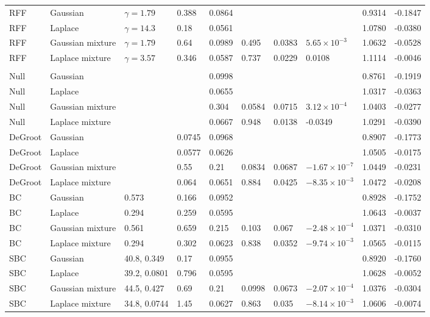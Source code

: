 \begin{longtable}{llllllllrr}
RFF & Gaussian & $\gamma=1.79$ & 0.388 & 0.0864 &  &  &  & 0.9314 & -0.1847 \\
RFF & Laplace & $\gamma=14.3$ & 0.18 & 0.0561 &  &  &  & 1.0780 & -0.0380 \\
RFF & Gaussian mixture & $\gamma=1.79$ & 0.64 & 0.0989 & 0.495 & 0.0383 & $5.65\times10^{-3}$ & 1.0632 & -0.0528 \\
RFF & Laplace mixture & $\gamma=3.57$ & 0.346 & 0.0587 & 0.737 & 0.0229 & 0.0108 & 1.1114 & -0.0046 \\
\midrule
\multicolumn{10}{l}{\senate{}} \\
Null & Gaussian &  &  & 0.0998 &  &  &  & 0.8761 & -0.1919 \\
Null & Laplace &  &  & 0.0655 &  &  &  & 1.0317 & -0.0363 \\
Null & Gaussian mixture &  &  & 0.304 & 0.0584 & 0.0715 & $3.12\times10^{-4}$ & 1.0403 & -0.0277 \\
Null & Laplace mixture &  &  & 0.0667 & 0.948 & 0.0138 & -0.0349 & 1.0291 & -0.0390 \\
DeGroot & Gaussian &  & 0.0745 & 0.0968 &  &  &  & 0.8907 & -0.1773 \\
DeGroot & Laplace &  & 0.0577 & 0.0626 &  &  &  & 1.0505 & -0.0175 \\
DeGroot & Gaussian mixture &  & 0.55 & 0.21 & 0.0834 & 0.0687 & $-1.67\times10^{-7}$ & 1.0449 & -0.0231 \\
DeGroot & Laplace mixture &  & 0.064 & 0.0651 & 0.884 & 0.0425 & $-8.35\times10^{-3}$ & 1.0472 & -0.0208 \\
BC & Gaussian & 0.573 & 0.166 & 0.0952 &  &  &  & 0.8928 & -0.1752 \\
BC & Laplace & 0.294 & 0.259 & 0.0595 &  &  &  & 1.0643 & -0.0037 \\
BC & Gaussian mixture & 0.561 & 0.659 & 0.215 & 0.103 & 0.067 & $-2.48\times10^{-4}$ & 1.0371 & -0.0310 \\
BC & Laplace mixture & 0.294 & 0.302 & 0.0623 & 0.838 & 0.0352 & $-9.74\times10^{-3}$ & 1.0565 & -0.0115 \\
SBC & Gaussian & 40.8, 0.349 & 0.17 & 0.0955 &  &  &  & 0.8920 & -0.1760 \\
SBC & Laplace & 39.2, 0.0801 & 0.796 & 0.0595 &  &  &  & 1.0628 & -0.0052 \\
SBC & Gaussian mixture & 44.5, 0.427 & 0.69 & 0.21 & 0.0998 & 0.0673 & $-2.07\times10^{-4}$ & 1.0376 & -0.0304 \\
SBC & Laplace mixture & 34.8, 0.0744 & 1.45 & 0.0627 & 0.863 & 0.035 & $-8.14\times10^{-3}$ & 1.0606 & -0.0074 \\

\end{longtable}
